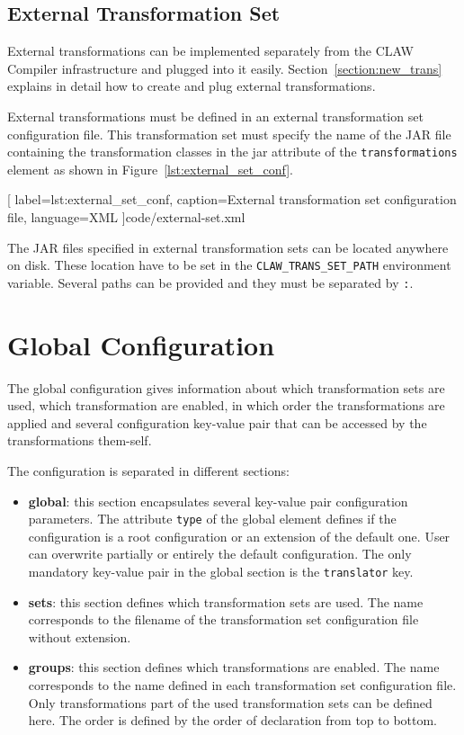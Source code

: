 \subsection{External Transformation Set}
External transformations can be implemented separately from the CLAW Compiler
infrastructure and plugged into it easily. Section~\ref{section:new_trans}
explains in detail how to create and plug external transformations.

External transformations must be defined in an external transformation set
configuration file. This transformation set must specify the
name of the JAR file containing the transformation classes in the jar attribute
of the \lstinline|transformations| element as shown in
Figure~\ref{lst:external_set_conf}.


  [
    label=lst:external_set_conf,
    caption=External transformation set configuration file,
    language=XML
  ]{code/external-set.xml}

The JAR files specified in external transformation sets can be located anywhere
on disk. These location have to be set in the \lstinline!CLAW_TRANS_SET_PATH!
environment variable.
Several paths can be provided and they must be separated by \lstinline!:!.


\section{\clawfcomp Global Configuration}
The global configuration gives information about which transformation sets are
used, which transformation are enabled, in which order the transformations are
applied and several configuration key-value pair that can be accessed by the
transformations them-self.

The configuration is separated in different sections:
\begin{itemize}
\item \textbf{global}: this section encapsulates several key-value pair
      configuration parameters. The attribute \lstinline!type! of the global
      element defines if the configuration is a root configuration or an
      extension of the default one. User can overwrite partially or entirely
      the default configuration.
      The only mandatory key-value pair in the global section is the
      \lstinline!translator! key.
\item \textbf{sets}: this section defines which transformation sets are used.
      The name corresponds to the filename of the transformation set
      configuration file without extension.
\item \textbf{groups}: this section defines which transformations are enabled.
      The name corresponds to the name defined in each transformation set
      configuration file.
      Only transformations part of the used transformation sets can be defined
      here.
      The order is defined by the order of declaration from top to bottom.
\end{itemize}


